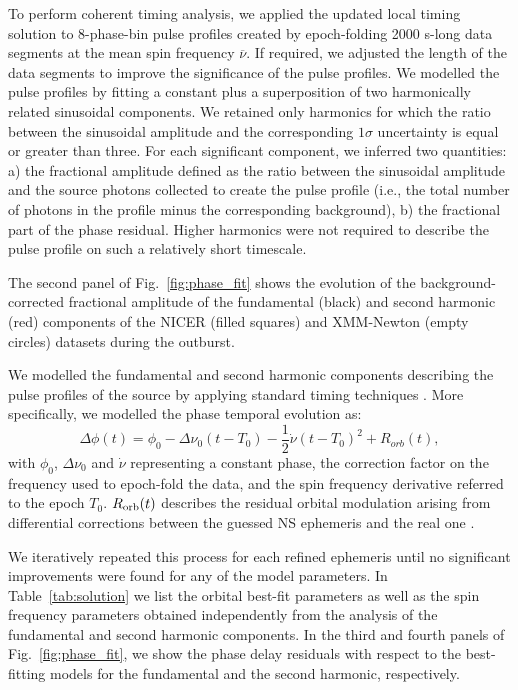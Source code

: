 \documentclass[fleqn,usenatbib]{mnras}
\newcommand{\nicer}{NICER}
\newcommand{\xmm}{XMM-Newton}
\begin{document}
To perform coherent timing analysis, we applied the updated local timing solution to 8-phase-bin pulse profiles created by epoch-folding 2000 s-long data segments at the mean spin frequency $\overline{\nu}$. If required, we adjusted the length of the data segments to improve the significance of the pulse profiles. We modelled the pulse profiles by fitting a constant plus a superposition of two harmonically related sinusoidal components. We retained only harmonics for which the ratio between the sinusoidal amplitude and the corresponding $1\sigma$ uncertainty is equal or greater than three. For each significant component, we inferred two quantities: a) the fractional amplitude defined as the ratio between the sinusoidal amplitude and the source photons collected to create the pulse profile (i.e., the total number of photons in the profile minus the corresponding background), b) the fractional part of the phase residual. Higher harmonics were not required to describe the pulse profile on such a relatively short timescale. 

The second panel of Fig.~\ref{fig:phase_fit} shows the evolution of the background-corrected fractional amplitude of the fundamental (black) and second harmonic (red) components of the \nicer{} (filled squares) and \xmm{} (empty circles) datasets during the outburst. 

We modelled the fundamental and second harmonic components describing the pulse profiles of the source by applying standard timing techniques \citep[see e.g.,][for more details]{Burderi:2007tl, Sanna:2018wh}. More specifically, we modelled the phase temporal evolution as:
\begin{equation}
\label{eq:fit_phase}
\Delta \phi(t)= \phi_0 - \Delta \nu_0(t-T_0)- \frac{1}{2} \dot{\nu}(t-T_0)^2+R_{orb}(t),
\end{equation}
with $\phi_0$, $\Delta \nu_0$ and $\dot{\nu}$ representing a constant phase, the correction factor on the frequency used to epoch-fold the data, and the spin frequency derivative referred to the epoch $T_0$. $R_{\rm orb}(t)$ describes the residual orbital modulation arising from differential corrections between the guessed NS ephemeris and the real one \citep[see e.g.,][]{Deeter:1981te}.

We iteratively repeated this process for each refined ephemeris until no significant improvements were found for any of the model parameters. In Table~\ref{tab:solution} we list the orbital best-fit parameters as well as the spin frequency parameters obtained independently from the analysis of the fundamental and second harmonic components. In the third and fourth panels of Fig.~\ref{fig:phase_fit}, we show the phase delay residuals with respect to the best-fitting models for the fundamental and the second harmonic, respectively. 
\end{document}
